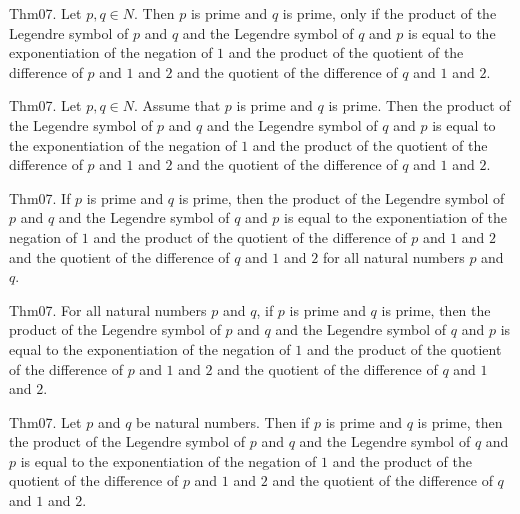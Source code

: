 \documentclass{article}
\begin{document}
Thm07. Let $p , q \in N$. Then $p$ is prime and $q$ is prime, only if the product of the Legendre symbol of $p$ and $q$ and the Legendre symbol of $q$ and $p$ is equal to the exponentiation of the negation of $1$ and the product of the quotient of the difference of $p$ and $1$ and $2$ and the quotient of the difference of $q$ and $1$ and $2$.

Thm07. Let $p , q \in N$. Assume that $p$ is prime and $q$ is prime. Then the product of the Legendre symbol of $p$ and $q$ and the Legendre symbol of $q$ and $p$ is equal to the exponentiation of the negation of $1$ and the product of the quotient of the difference of $p$ and $1$ and $2$ and the quotient of the difference of $q$ and $1$ and $2$.

Thm07. If $p$ is prime and $q$ is prime, then the product of the Legendre symbol of $p$ and $q$ and the Legendre symbol of $q$ and $p$ is equal to the exponentiation of the negation of $1$ and the product of the quotient of the difference of $p$ and $1$ and $2$ and the quotient of the difference of $q$ and $1$ and $2$ for all natural numbers $p$ and $q$.

Thm07. For all natural numbers $p$ and $q$, if $p$ is prime and $q$ is prime, then the product of the Legendre symbol of $p$ and $q$ and the Legendre symbol of $q$ and $p$ is equal to the exponentiation of the negation of $1$ and the product of the quotient of the difference of $p$ and $1$ and $2$ and the quotient of the difference of $q$ and $1$ and $2$.

Thm07. Let $p$ and $q$ be natural numbers. Then if $p$ is prime and $q$ is prime, then the product of the Legendre symbol of $p$ and $q$ and the Legendre symbol of $q$ and $p$ is equal to the exponentiation of the negation of $1$ and the product of the quotient of the difference of $p$ and $1$ and $2$ and the quotient of the difference of $q$ and $1$ and $2$.
\end{document}
